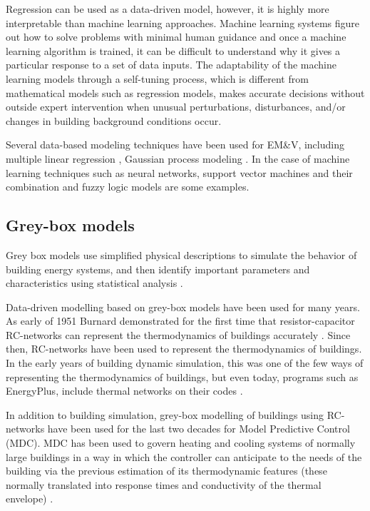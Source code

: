 \documentclass[3p,times,procedia]{elsarticle}
\begin{document}
Regression can be used as a data-driven model, however, it is highly more interpretable than machine learning approaches. 
Machine learning systems figure out how to solve problems with minimal human guidance and once a machine learning algorithm is trained, it can be difficult to understand why it gives a particular response to a set of data inputs. The adaptability of the machine learning models through a self-tuning process, which is different from mathematical models such as regression models, makes accurate decisions without outside expert intervention when unusual perturbations, disturbances, and/or changes in building background conditions occur.

Several data-based modeling techniques have been used for EM\&V, including multiple linear regression \cite{braun2014using},  Gaussian process modeling \cite{heo2012gaussian}.  %
In the case of machine learning techniques such as neural networks, support vector machines and their combination \cite{ahmad2014review} and fuzzy logic models \cite{ciabattoni2014fuzzy} are some examples.    

\subsection{Grey-box models}

Grey box models use simplified physical descriptions to simulate the behavior of building energy systems, and then identify important parameters and characteristics using statistical analysis \cite{handbook2017america}.

Data-driven modelling based on grey-box models have been used for many years. As early of 1951 Burnard demonstrated for the first time that resistor-capacitor RC-networks can represent the thermodynamics of buildings accurately \cite{burnand1952study}. Since then, RC-networks have been used to represent the thermodynamics of buildings. In the early years of building dynamic simulation, this was one of the few ways of representing the thermodynamics of buildings, but even today, programs such as EnergyPlus, include thermal networks on their codes \cite{handbook2017america} .

In addition to building simulation, grey-box modelling of buildings using RC-networks have been used for the last two decades for Model Predictive Control (MDC). MDC has been used to govern heating and cooling systems of normally large buildings in a way in which the controller can anticipate to the needs of the building via the previous estimation of its thermodynamic features (these normally translated into response times and conductivity of the thermal envelope) \cite{coley1992second}.
\end{document}
